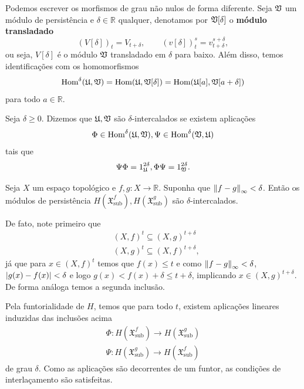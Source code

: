 \begin{obs}
Podemos escrever os morfismos de grau não nulos de forma diferente. Seja $\mathfrak{V}$ um módulo
de persistência e $\delta \in \mathbb{R}$ qualquer, denotamos por $\mathfrak{V}[\delta]$ o 
\textbf{módulo transladado} 
\begin{equation*}
    (V[\delta])_t = V_{t+\delta}, \qquad (v[\delta])^s_t = v^{s+\delta}_{t+\delta},
\end{equation*}
ou seja, $V[\delta]$ é o módulo $\mathfrak{V}$ transladado em $\delta$ para baixo. Além disso,
temos identificações com os homomorfismos
\begin{equation*}
    \text{Hom}^\delta(\mathfrak{U}, \mathfrak{V}) = \text{Hom}(\mathfrak{U}, \mathfrak{V}[\delta]) 
    = \text{Hom}(\mathfrak{U}[a], \mathfrak{V}[a+\delta])
\end{equation*}
para todo $a \in \mathbb{R}$. 
\end{obs}

\begin{defi}
    Seja $\delta \geq 0$. Dizemos que $\mathfrak{U}, \mathfrak{V}$ são $\delta$-intercalados se
    existem aplicações 
    \begin{equation*}
        \Phi \in \text{Hom}^\delta(\mathfrak{U}, \mathfrak{V}), \Psi \in \text{Hom}^\delta(\mathfrak{V}, \mathfrak{U}) 
    \end{equation*}
    tais que
    \begin{equation*}
        \Psi\Phi = 1_{\mathfrak{U}}^{2\delta}, \Phi\Psi = 1_{\mathfrak{V}}^{2\delta}.
    \end{equation*}
\end{defi}

\begin{ex}
    Seja $X$ um espaço topológico e $f,g \colon X \to \mathbb{R}$. Suponha que $\left\lVert f-g\right\rVert_\infty 
    < \delta$. Então os módulos de persistência $H(\mathfrak{X}^f_{\text{sub}}), H(\mathfrak{X}^g_{\text{sub}})$
    são $\delta$-intercalados.  
    
    De fato, note primeiro que 
    \begin{align*}
        & (X,f)^t \subseteq (X,g)^{t+\delta} \\
        & (X,g)^t \subseteq (X,f)^{t+\delta},
    \end{align*}
    já que para $x \in (X,f)^t$ temos que $f(x) \leq t$ e como 
    $\left\lVert f-g\right\rVert_\infty < \delta$, $\left\lvert g(x) - f(x)\right\rvert < \delta$ 
    e logo $g(x) < f(x) + \delta \leq t + \delta$, implicando 
    $x \in (X,g)^{t+\delta}$. De forma análoga temos a segunda inclusão.  

    Pela funtorialidade de $H$, temos que para todo $t$, existem aplicações lineares induzidas das
    inclusões acima
    \begin{align*}
        \Phi \colon H(\mathfrak{X}_{\text{sub}}^f) \to H(\mathfrak{X}_{\text{sub}}^g) \\
        \Psi \colon H(\mathfrak{X}_{\text{sub}}^g) \to H(\mathfrak{X}_{\text{sub}}^f)
    \end{align*}
    de grau $\delta$. Como as aplicações são decorrentes de um funtor, as condições de interlaçamento
    são satisfeitas.
\end{ex}

